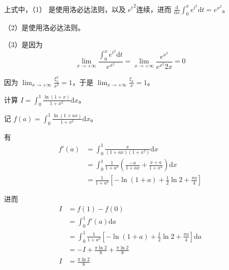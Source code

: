 上式中，（1） 是使用洛必达法则，以及 $\displaystyle e{^{t}}^{2}$连续，进而 $\displaystyle \frac{\mathrm{d}}{\mathrm{d} x}\int _{0}^{x} e^{t^{2}}\mathrm{d} t=e^{x^{2}}$。

（2）是使用洛必达法则。

（3）是因为
\begin{equation*}
	\lim _{x\rightarrow +\infty }\frac{\int _{0}^{x} e^{t^{2}}\mathrm{d} t}{e^{x^{2}}} =\lim _{x\rightarrow +\infty }\frac{e^{x^{2}}}{e^{x^{2}} 2x} =0
\end{equation*}


因为 $\displaystyle \lim _{x\rightarrow +\infty }\frac{\xi _{x}^{2}}{x^{2}} =1$，于是 $\displaystyle \lim _{x\rightarrow +\infty }\frac{\xi _{x}}{x} =1$。





\begin{ques}
	计算 $\displaystyle I=\int _{0}^{1}\frac{\ln( 1+x)}{1+x^{2}}\mathrm{d} x$。
\end{ques}



记 $\displaystyle f( a) =\int _{0}^{1}\frac{\ln( 1+ax)}{1+x^{2}}\mathrm{d} x$。

有
\begin{equation*}
	\begin{aligned}
		f'( a) & =\int _{0}^{1}\frac{x}{( 1+ax)\left( 1+x^{2}\right)}\mathrm{d} x\\
		& =\int _{0}^{1}\frac{1}{1+a^{2}}\left(\frac{-a}{1+ax} +\frac{x+a}{1+x^{2}}\right)\mathrm{d} x\\
		& =\frac{1}{1+a^{2}}\left[ -\ln( 1+a) +\frac{1}{2}\ln 2+\frac{\pi a}{4}\right]
	\end{aligned}
\end{equation*}

进而
\begin{equation*}
	\begin{aligned}
		I & =f( 1) -f( 0)\\
		& =\int _{0}^{1} f'( a)\mathrm{d} a\\
		& =\int _{0}^{1}\frac{1}{1+a^{2}}\left[ -\ln( 1+a) +\frac{1}{2}\ln 2+\frac{\pi a}{4}\right]\mathrm{d} a\\
		& =-I+\frac{\pi \ln 2}{8} +\frac{\pi \ln 2}{8}\\
		I & =\frac{\pi \ln 2}{8}
	\end{aligned}
\end{equation*}






